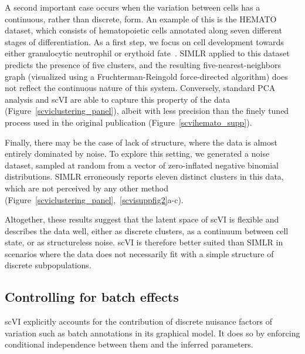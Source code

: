 A second important case occurs when the variation between cells has a continuous, rather than discrete, form. An example of this is the HEMATO dataset, which consists of hematopoietic cells annotated along seven different stages of differentiation. As a first step, we focus on cell development towards either granulocytic neutrophil or erythoid fate~\cite{Tusi2018}. SIMLR applied to this dataset predicts the presence of five clusters, and the resulting five-nearest-neighbors graph (visualized using a Fruchterman-Reingold force-directed algorithm) does not reflect the continuous nature of this system. Conversely, standard PCA analysis and scVI are able to capture this property of the data (Figure~\ref{scviclustering_panel}), albeit with less precision than the finely tuned process used in the original publication (Figure~\ref{scvihemato_supp}). 

Finally, there may be the case of lack of structure, where the data is almost entirely dominated by noise. To explore this setting, we generated a noise dataset, sampled at random from a vector of zero-inflated negative binomial distributions. SIMLR erroneously reports eleven distinct clusters in this data, which are not perceived by any other method (Figure~\ref{scviclustering_panel},~\ref{scvisuppfig2}a-c).

Altogether, these results suggest that the latent space of scVI is flexible and describes the data well, either as discrete clusters, as a continuum between cell state, or as structureless noise. scVI is therefore better suited than SIMLR in scenarios where the data does not necessarily fit with a simple structure of discrete subpopulations.


\subsection{Controlling for batch effects}
\label{scvibatch_results}
scVI explicitly accounts for the contribution of discrete nuisance factors of variation such as batch annotations in its graphical model. It does so by enforcing conditional independence between them and the inferred parameters.

